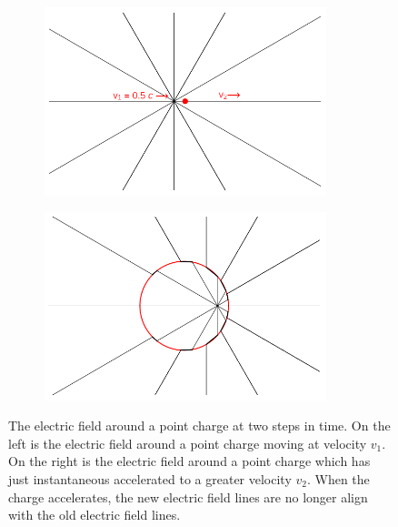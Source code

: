 \documentclass[12pt]{article}
\begin{document}
\begin{figure}[h]
    \begin{subfigure}{0.5\textwidth}
    \centering
    	\includegraphics[width=0.9\textwidth]{charge-moving-at-v1.png}
    \end{subfigure}
    \begin{subfigure}{0.5\textwidth}
    	\centering
    	\includegraphics[width=0.9\textwidth]{charge-moving-at-v2.png}
    \end{subfigure}
    \caption{\cite{wolframwave} The electric field around a point charge at two steps in time. On the left is the electric field around a point charge moving at velocity $v_1$. On the right is the electric field around a point charge which has just instantaneous accelerated to a greater velocity $v_2$. When the charge accelerates, the new electric field lines are no longer align with the old electric field lines. }
\end{figure} 
\end{document}
